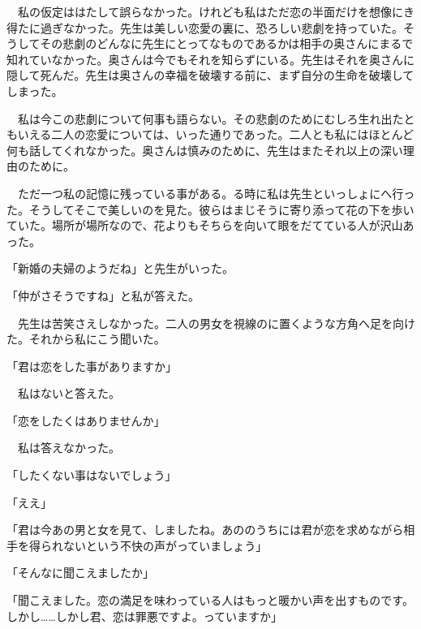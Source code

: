 \documentclass[a4j,onecolumn]{tarticle}
\begin{document}
　私の仮定ははたして誤らなかった。\hbox{}けれども私はただ恋の半面だけを想像にき得たに過ぎなかった。\hbox{}先生は美しい恋愛の裏に、\hbox{}恐ろしい悲劇を持っていた。\hbox{}そうしてその悲劇のどんなに先生にとってなものであるかは相手の奥さんにまるで知れていなかった。\hbox{}奥さんは今でもそれを知らずにいる。\hbox{}先生はそれを奥さんに隠して死んだ。\hbox{}先生は奥さんの幸福を破壊する前に、\hbox{}まず自分の生命を破壊してしまった。\hbox{}\par{}
　私は今この悲劇について何事も語らない。\hbox{}その悲劇のためにむしろ生れ出たともいえる二人の恋愛については、\hbox{}いった通りであった。\hbox{}二人とも私にはほとんど何も話してくれなかった。\hbox{}奥さんは慎みのために、\hbox{}先生はまたそれ以上の深い理由のために。\hbox{}\par{}
　ただ一つ私の記憶に残っている事がある。\hbox{}る時に私は先生といっしょにへ行った。\hbox{}そうしてそこで美しいのを見た。\hbox{}彼らはまじそうに寄り添って花の下を歩いていた。\hbox{}場所が場所なので、\hbox{}花よりもそちらを向いて眼をだてている人が沢山あった。\hbox{}\par{}
「新婚の夫婦のようだね」と先生がいった。\hbox{}\par{}
「仲がさそうですね」と私が答えた。\hbox{}\par{}
　先生は苦笑さえしなかった。\hbox{}二人の男女を視線のに置くような方角へ足を向けた。\hbox{}それから私にこう聞いた。\hbox{}\par{}
「君は恋をした事がありますか」\par{}
　私はないと答えた。\hbox{}\par{}
「恋をしたくはありませんか」\par{}
　私は答えなかった。\hbox{}\par{}
「したくない事はないでしょう」\par{}
「ええ」\par{}
「君は今あの男と女を見て、\hbox{}しましたね。\hbox{}あののうちには君が恋を求めながら相手を得られないという不快の声がっていましょう」\par{}
「そんなに聞こえましたか」\par{}
「聞こえました。\hbox{}恋の満足を味わっている人はもっと暖かい声を出すものです。\hbox{}しかし……しかし君、\hbox{}恋は罪悪ですよ。\hbox{}っていますか」\par{}
\end{document}
